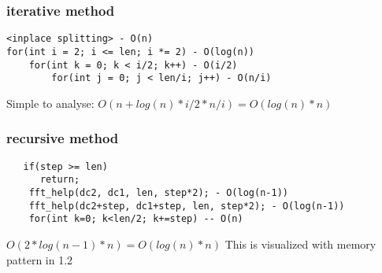 \subsubsection{iterative method}
\begin{lstlisting}
<inplace splitting> - O(n)
for(int i = 2; i <= len; i *= 2) - O(log(n))
	for(int k = 0; k < i/2; k++) - O(i/2)
		for(int j = 0; j < len/i; j++) - O(n/i)

\end{lstlisting}
Simple to analyse:
\begin{math}
O(n + log(n) * i/2 * n/i) = O(log(n)*n)
\end{math}
\subsubsection{recursive method}
\begin{lstlisting}
   if(step >= len)
      return;
    fft_help(dc2, dc1, len, step*2); - O(log(n-1))
    fft_help(dc2+step, dc1+step, len, step*2); - O(log(n-1))
    for(int k=0; k<len/2; k+=step) -- O(n)
\end{lstlisting}
\begin{math}
O(2*log(n-1) * n) = O(log(n)*n)
\end{math}\newline
This is visualized with memory pattern in 1.2